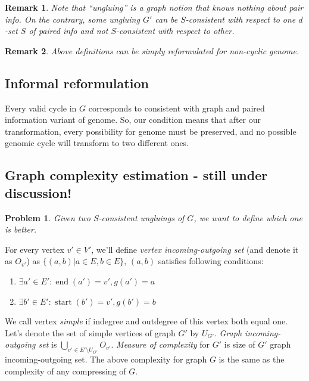 \documentclass[12pt,a4paper,oneside]{article}
\newtheorem{problem}{Problem}
\newtheorem{remark}{Remark}
\begin{document}
\begin{remark}
  Note that ``ungluing'' is a graph notion that knows nothing about pair info. On the contrary, some ungluing $G'$ can be $S$-consistent with respect to one $d$-set $S$ of paired info and not $S$-consistent with respect to other.
\end{remark}


\begin{remark}
Above definitions can be simply reformulated for non-cyclic genome.
\end{remark}
\subsection{Informal reformulation}
Every valid cycle in $G$ corresponds to consistent with graph and paired information variant of genome. So, our condition means that after our transformation, every possibility for genome must be preserved, and no possible genomic cycle will transform to two different ones.


\subsection{Graph complexity estimation - still under discussion!}
\begin{problem}
  Given two $S$-consistent ungluings of $G$, we want to define which one is better.
\end{problem}
  For every vertex $v' \in V'$, we'll define \emph{vertex incoming-outgoing set} (and denote it as $O_{v'}$)  as $\{(a, b)| a\in E, b\in E\}$, $(a, b)$ satisfies following conditions:
\begin{enumerate}
 \item $\exists a' \in E' : \mathop{end}(a')=v', g(a') = a$
 \item $\exists b' \in E' : \mathop{start}(b')=v', g(b') = b$
\end{enumerate}
 We call vertex \emph{simple} if indegree and outdegree of this vertex both equal one. Let's denote the set of simple vertices of graph $G'$ by $U_{G'}$. 
\emph{Graph incoming-outgoing set} is $\bigcup\limits_{v'\in E'\setminus U_{G'}}  O_{v'}$.
\emph{Measure of complexity} for $G'$ is size of $G'$ graph incoming-outgoing set.
The above complexity for graph $G$ is the same as the complexity of any compressing of $G$.
\end{document}
